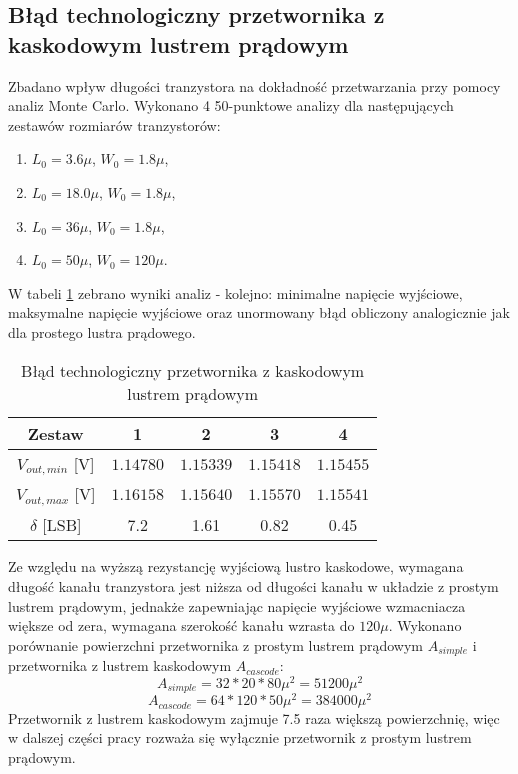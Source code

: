 \documentclass[10pt,a4paper,twoside]{report}
\theoremstyle{definition}
\theoremstyle{definition}
\theoremstyle{definition}
\theoremstyle{definition}
\theoremstyle{definition}
\begin{document}
{{{{	\subsection{Błąd technologiczny przetwornika z kaskodowym lustrem prądowym}
	{	Zbadano wpływ długości tranzystora na dokładność przetwarzania przy pomocy analiz Monte Carlo. Wykonano 4 50-punktowe analizy dla następujących zestawów rozmiarów tranzystorów:
	\begin{enumerate}
		\item $L_0 = 3.6\mu$, $W_0 = 1.8\mu$,
		\item $L_0 = 18.0\mu$, $W_0 = 1.8\mu$,
		\item $L_0 = 36\mu$, $W_0 = 1.8\mu$,
		\item $L_0 = 50\mu$, $W_0 = 120\mu$.
	\end{enumerate}
	W tabeli \ref{tab:delta_cascode} zebrano wyniki analiz - kolejno: minimalne napięcie wyjściowe, maksymalne napięcie wyjściowe oraz unormowany błąd obliczony analogicznie jak dla prostego lustra prądowego.
	\begin{table}[!ht]
	\begin{center}
		\begin{tabular}{|c|c|c|c|c|}
			\hline 
			Zestaw & 1 & 2 & 3  & 4\\ 
			\hline 
			$V_{out,min}$ [V] & $1.14780$ & $1.15339$ & $1.15418$ & $1.15455$ \\ 
			\hline
			$V_{out,max}$ [V] & $1.16158$ & $1.15640$ & $1.15570$ & $1.15541$\\ 
			\hline 
			$\delta$ [LSB]  & 7.2 & 1.61 & 0.82 & 0.45\\
			\hline
		\end{tabular} 
	\caption{Błąd technologiczny przetwornika z kaskodowym lustrem prądowym}
	\label{tab:delta_cascode}
	\end{center}
	\end{table}

	Ze względu na wyższą rezystancję wyjściową lustro kaskodowe, wymagana długość kanału tranzystora jest niższa od długości kanału w układzie z prostym lustrem prądowym, jednakże zapewniając napięcie wyjściowe wzmacniacza większe od zera, wymagana szerokość kanału wzrasta do $120\mu$. Wykonano porównanie powierzchni przetwornika z prostym lustrem prądowym $A_{simple}$ i przetwornika z lustrem kaskodowym $A_{cascode}$:
	\begin{equation}
		A_{simple}  = 32*20*80 \mu^2 = 51 200  \mu^2 
	\end{equation}
	\begin{equation}
		A_{cascode}  = 64*120*50 \mu^2 = 384 000 \mu^2
	\end{equation}
	Przetwornik z lustrem kaskodowym zajmuje 7.5 raza większą powierzchnię, więc w dalszej części pracy rozważa się wyłącznie przetwornik z prostym lustrem prądowym.
	
}}}}}
\end{document}

